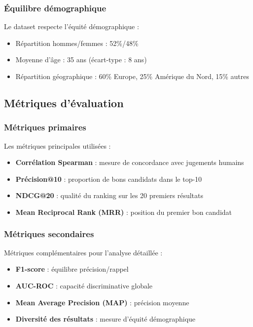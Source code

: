 \documentclass[12pt,a4paper]{report}
\begin{document}
\subsubsection{Équilibre démographique}

Le dataset respecte l'équité démographique :
\begin{itemize}
\item Répartition hommes/femmes : 52\%/48\%
\item Moyenne d'âge : 35 ans (écart-type : 8 ans)
\item Répartition géographique : 60\% Europe, 25\% Amérique du Nord, 15\% autres
\end{itemize}

\subsection{Métriques d'évaluation}

\subsubsection{Métriques primaires}

Les métriques principales utilisées :
\begin{itemize}
\item \textbf{Corrélation Spearman} : mesure de concordance avec jugements humains
\item \textbf{Précision@10} : proportion de bons candidats dans le top-10
\item \textbf{NDCG@20} : qualité du ranking sur les 20 premiers résultats
\item \textbf{Mean Reciprocal Rank (MRR)} : position du premier bon candidat
\end{itemize}

\subsubsection{Métriques secondaires}

Métriques complémentaires pour l'analyse détaillée :
\begin{itemize}
\item \textbf{F1-score} : équilibre précision/rappel
\item \textbf{AUC-ROC} : capacité discriminative globale
\item \textbf{Mean Average Precision (MAP)} : précision moyenne
\item \textbf{Diversité des résultats} : mesure d'équité démographique
\end{itemize}
\end{document}
